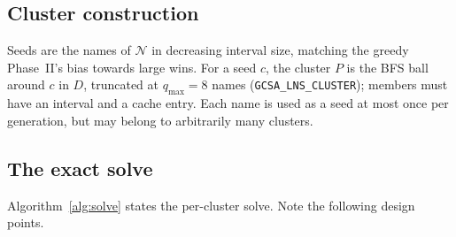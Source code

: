 \documentclass[11pt,a4paper]{article}
\theoremstyle{definition}
\theoremstyle{plain}
\theoremstyle{remark}
\newcommand{\Names}{\mathcal{N}}
\begin{document}
\subsection{Cluster construction}

Seeds are the names of $\Names$ in decreasing interval size, matching the
greedy Phase~II's bias towards large wins. For a seed $c$, the cluster
$P$ is the BFS ball around $c$ in $D$, truncated at
$q_{\max} = 8$ names (\texttt{GCSA\_LNS\_CLUSTER}); members must have an
interval and a cache entry. Each name is used as a seed at most once per
generation, but may belong to arbitrarily many clusters.

\subsection{The exact solve}
\label{sec:algo:solve}

Algorithm~\ref{alg:solve} states the per-cluster solve. Note the
following design points.
\end{document}
